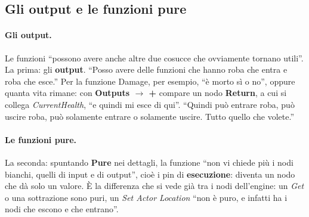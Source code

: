 \subsection{Gli output e le funzioni pure}

\paragraph{Gli output.} Le funzioni ``possono avere anche altre due cosucce che
ovviamente tornano utili''. La prima: gli \textbf{output}. ``Posso avere delle
funzioni che hanno roba che entra e roba che esce.'' Per la funzione Damage,
per esempio, ``è morto sì o no'', oppure quanta vita rimane: con \textbf{Outputs
$\rightarrow$ +} compare un nodo \textbf{Return}, a cui si collega
\emph{CurrentHealth}, ``e quindi mi esce di qui''. ``Quindi può entrare roba,
può uscire roba, può solamente entrare o solamente uscire. Tutto quello che
volete.''

\paragraph{Le funzioni pure.} La seconda: spuntando \textbf{Pure} nei dettagli,
la funzione ``non vi chiede più i nodi bianchi, quelli di input e di output'',
cioè i pin di \textbf{esecuzione}: diventa un nodo che dà solo un valore. È la
differenza che si vede già tra i nodi dell'engine: un \emph{Get} o una
sottrazione sono puri, un \emph{Set Actor Location} ``non è puro, e infatti ha i
nodi che escono e che entrano''.

